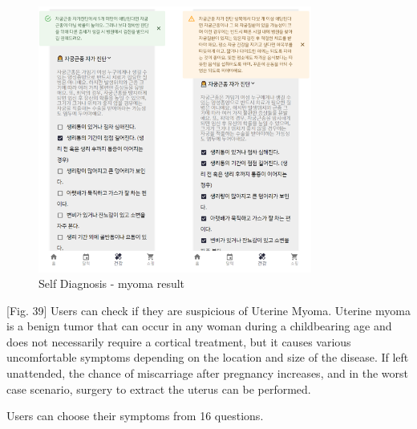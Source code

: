 \documentclass[conference]{IEEEtran}
\begin{document}
\begin{itemize}
\begin{enumerate}
        \begin{figure}[ht]
        \includegraphics[width=9cm, center]{myoma.PNG}
        \caption{Self Diagnosis - myoma result}
        \label{fig40}
        \end{figure}
        
        [Fig. 39] Users can check if they are suspicious of Uterine Myoma. Uterine myoma is a benign tumor that can occur in any woman during a childbearing age and does not necessarily require a cortical treatment, but it causes various uncomfortable symptoms depending on the location and size of the disease. If left unattended, the chance of miscarriage after pregnancy increases, and in the worst case scenario, surgery to extract the uterus can be performed.
        
       \setlength{\parindent}{2ex} Users can choose their symptoms from 16 questions.
        

\end{enumerate}
\end{itemize}
\end{document}

